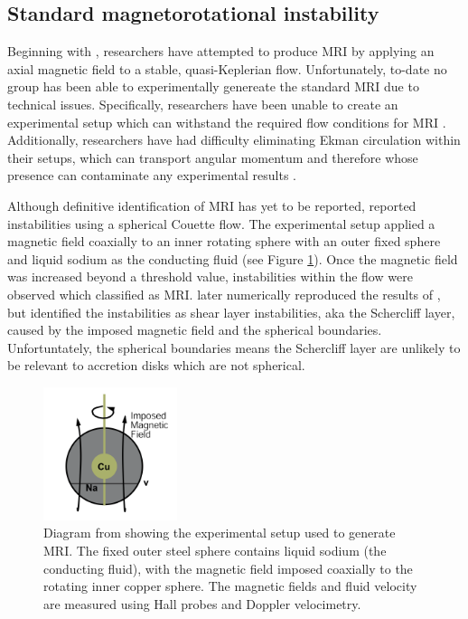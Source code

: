 \documentclass{jfm}
\begin{document}
%
%
\subsection{Standard magnetorotational instability}
\label{sec:standard_mri}
Beginning with \cite{Ji2001}, researchers have attempted to produce MRI by
applying an axial magnetic field to a stable, quasi-Keplerian flow. Unfortunately,
to-date no group has been able to experimentally genereate the standard MRI due
to technical issues. Specifically, researchers have been unable to create an
experimental setup which can withstand the required flow conditions for MRI
\citep{Ji2001, Ji2002}. Additionally, researchers have had difficulty
eliminating Ekman circulation within their setups, which can transport angular
momentum and therefore whose presence can contaminate any experimental results 
\cite{Kageyama2004}.

Although definitive identification of MRI has yet to be reported, \cite{Sisan2004}
reported instabilities using a spherical Couette flow. The experimental setup
applied a magnetic field coaxially to an inner rotating sphere with an outer
fixed sphere and liquid sodium as the conducting fluid (see Figure \ref{fig:diagram_Sisan}).
Once the magnetic field was increased beyond a threshold value, instabilities
within the flow were observed which \cite{Sisan2004} classified as MRI.
\cite{Gissinger2011} later numerically reproduced the results of \cite{Sisan2004},
but identified the instabilities as shear layer instabilities, aka the 
Schercliff layer, caused by the imposed magnetic field and the spherical boundaries. 
Unfortuntately, the spherical boundaries means the Schercliff layer are unlikely
to be relevant to accretion disks which are not spherical.

\begin{figure}
    \centering
    \includegraphics[width=0.35\textwidth]{Sisan2004_diagram}
    \caption{Diagram from \cite{Sisan2004} showing the experimental setup used to generate MRI. The fixed outer steel sphere contains liquid sodium (the conducting fluid), with the magnetic field imposed coaxially to the rotating inner copper sphere. The magnetic fields and fluid velocity are measured using Hall probes and Doppler velocimetry.}
    \label{fig:diagram_Sisan}
\end{figure}
\end{document}
